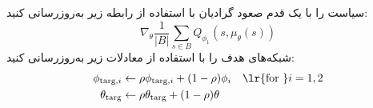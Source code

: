 \begin{algorithm}[H]
\begin{algorithmic}[1]
  		\State سیاست را با یک قدم صعود گرادیان با استفاده از رابطه زیر به‌روزرسانی کنید:
  		 \begin{equation*}
  		 	 \nabla_{\theta} \frac{1}{|B|}\sum_{s \in B}Q_{\phi_1}(s, \mu_{\theta}(s))
  		 	  \end{equation*}
  		\State شبکه‌های هدف را با استفاده از معادلات زیر به‌روزرسانی کنید:
  		\begin{align*}
  			\phi_{\text{targ},i} &\leftarrow \rho \phi_{\text{targ}, i} + (1-\rho) \phi_i \quad \text{\lr{for }}i=1,2  \\
  			\theta_{\text{targ}} &\leftarrow \rho \theta_{\text{targ}} + (1-\rho) \theta
  		\end{align*}
  		\EndIf
  		\EndFor
  		\EndIf
  		\EndWhile
  	\end{algorithmic}
  \end{algorithm}
  
  
  
  
  
  
  
  
  
  
  